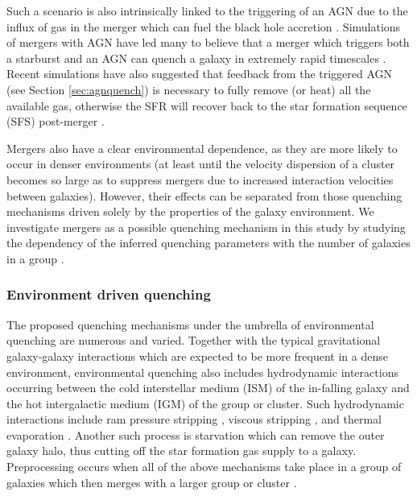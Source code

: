 \documentclass[useAMS,usenatbib]{mn2e}
\begin{document}
Such a scenario is also intrinsically linked to the triggering of an AGN due to the influx of gas in the merger which can fuel the black hole accretion \citep{sanders88, dimatteo05, hopkins09a, treister12}. Simulations of mergers with AGN have led many to believe that a merger which triggers both a starburst and an AGN can quench a galaxy in extremely rapid timescales \citep{springel05b, bell06}. Recent simulations have also suggested that feedback from the triggered AGN (see Section \ref{sec:agnquench}) is necessary to fully remove (or heat) all the available gas, otherwise the SFR will recover back to the star formation sequence (SFS) post-merger \citep{athanassoula16, pontzen16, sparre16}. 

Mergers also have a clear environmental dependence, as they are more likely to occur in denser environments (at least until the velocity dispersion of a cluster becomes so large as to suppress mergers due to increased interaction velocities between galaxies). However, their effects can be separated from those quenching mechanisms driven solely by the properties of the galaxy environment. We investigate mergers as a possible quenching mechanism in this study by studying the dependency of the inferred quenching parameters with the number of galaxies in a group . 

\subsubsection{Environment driven quenching}\label{sec:envquench}

The proposed quenching mechanisms under the umbrella of environmental quenching are numerous and varied. Together with the typical gravitational galaxy-galaxy interactions \citep{moore96} which are expected to be more frequent in a dense environment, environmental quenching also includes hydrodynamic interactions occurring between the cold interstellar medium (ISM) of the in-falling galaxy and the hot intergalactic medium (IGM) of the group or cluster. Such hydrodynamic interactions include ram pressure stripping \citep{gunngott72}, viscous stripping \citep{nulsen82}, and thermal evaporation \citep[a rapid rise in temperature of the ISM due to contact with the IGM;][]{cowie77}. Another such process is starvation \citep[also called strangulation;][]{larson80} which can remove the outer galaxy halo, thus cutting off the star formation gas supply to a galaxy. Preprocessing occurs when all of the above mechanisms take place in a group of galaxies which then merges with a larger group or cluster \citep{dressler04}. 
\end{document}
